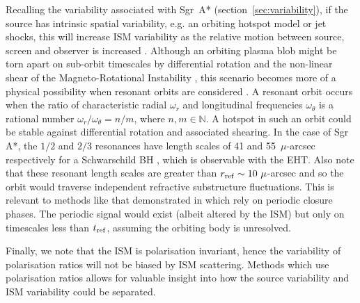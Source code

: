 Recalling the variability associated with Sgr~A* (section~\ref{sec:variability}), if the source has intrinsic spatial variability, e.g. an orbiting hotspot model \citep{Doeleman_2009b} or jet shocks, this will increase ISM variability as the relative motion between source, screen and observer is increased \citep{Blecher_2016}. Although an orbiting plasma blob might be torn apart on sub-orbit timescales by differential rotation and the non-linear shear of the Magneto-Rotational Instability \citep[(MRI)][]{Balbus_1991}, this scenario becomes more of a physical possibility when resonant orbits are considered \citep{Brink_2015}. A resonant orbit occurs when the ratio of characteristic radial $\omega_r$ and longitudinal frequencies $\omega_\theta$ is a rational number $\omega_r/\omega_\theta = n/m$, where $n,m \in \mathbb{N}$. A hotspot in such an orbit could be stable against differential rotation and associated shearing. In the case of Sgr A*, the $1/2$ and $2/3$ resonances have  length scales of 41 and 55~$\mu$-arcsec respectively for a Schwarschild BH \citep{Brink_2015}, which is observable with the EHT. Also note that these resonant length scales are greater than $r_{\rm ref} \sim 10\ \mu$-arcsec and so the orbit would traverse independent refractive substructure fluctuations. This is relevant to methods like that demonstrated in \citet{Doeleman_2009b} which rely on periodic closure phases. The periodic signal would exist (albeit altered by the ISM) but only on timescales less than $t_{\rm ref}$, assuming the orbiting body is unresolved.


Finally, we note that the ISM is polarisation invariant, hence the variability of polarisation ratios will not be biased by ISM scattering. Methods which use polarisation ratios \citep[e.g.][]{Johnson_2014} allows for valuable insight into how the source variability and ISM variability could be separated.



